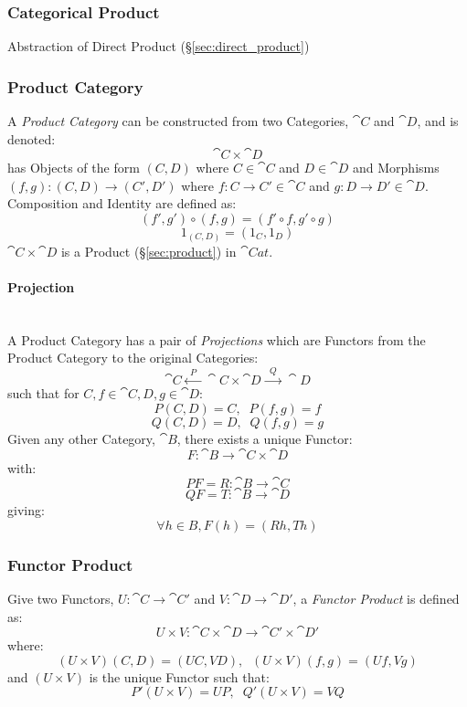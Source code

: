 \subsubsection{Categorical Product}\label{sec:categorical_product}

Abstraction of Direct Product (\S\ref{sec:direct_product})



\subsubsection{Product Category}\label{sec:product_category}

A \emph{Product Category} can be constructed from two Categories,
$\cat{C}$ and $\cat{D}$, and is denoted:
\[
  \cat{C} \times \cat{D}
\]
has Objects of the form $(C,D)$ where $C \in \cat{C}$ and $D \in
\cat{D}$ and Morphisms $(f,g) : (C,D) \rightarrow (C',D')$ where $f
: C \rightarrow C' \in \cat{C}$ and $g : D \rightarrow D' \in
\cat{D}$. Composition and Identity are defined as:
\[
  (f',g') \circ (f,g) = (f' \circ f,g' \circ g)
\]\[
  1_{(C,D)} = (1_C, 1_D)
\]
$\cat{C} \times \cat{D}$ is a Product (\S\ref{sec:product}) in
$\cat{Cat}$.



\paragraph{Projection}\label{sec:projection_functor}
\hfill \\
A Product Category has a pair of \emph{Projections} which are Functors
from the Product Category to the original Categories:
\[
  \cat{C} \xleftarrow{\;\; P\;\;} \cat{C}\times\cat{D}
  \xrightarrow{\;\; Q\;\;} \cat{D}
\]
such that for $C,f \in \cat{C}, D,g \in \cat{D}$:
\[
  P(C,D) = C, \;\; P(f,g) = f
\]\[
  Q(C,D) = D, \;\; Q(f,g) = g
\]
Given any other Category, $\cat{B}$, there exists a unique Functor:
\[
  F : \cat{B} \rightarrow \cat{C} \times \cat{D}
\]
with:
\[
  PF = R : \cat{B} \rightarrow \cat{C}
\]\[
  QF = T : \cat{B} \rightarrow \cat{D}
\]
giving:
\[
  \forall h \in B, F(h) = (Rh,Th)
\]



\subsubsection{Functor Product}\label{sec:functor_product}

Give two Functors, $U : \cat{C} \rightarrow \cat{C'}$ and $V :
\cat{D} \rightarrow \cat{D'}$, a \emph{Functor Product} is
defined as:
\[
  U \times V : \cat{C} \times \cat{D}
  \rightarrow \cat{C'} \times \cat{D'}
\]
where:
\[
  (U \times V)(C,D) = (UC,VD), \;\; (U \times V)(f,g) = (Uf,Vg)
\]
and $(U \times V)$ is the unique Functor such that:
\[
  P'(U \times V) = UP, \;\; Q'(U \times V) = VQ
\]



